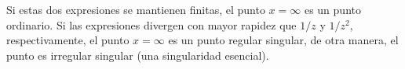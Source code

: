 \documentclass[12pt]{article}
\numberwithin{equation}{section}
\begin{document}
Si estas dos expresiones se mantienen finitas, el punto $x = \infty$ es un punto ordinario. Si las expresiones divergen con mayor rapidez que $1/z$ y $1/z^{2}$, respectivamente, el punto $x = \infty$ es un punto regular singular, de otra manera, el punto es irregular singular (una singularidad esencial).









\end{document}

